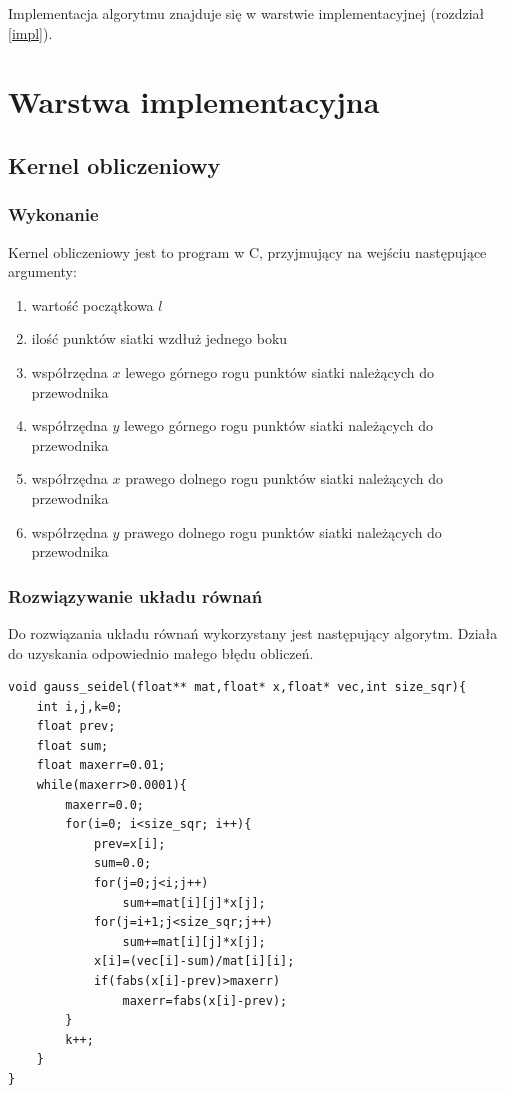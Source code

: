 \documentclass{article}
\begin{document}
Implementacja algorytmu znajduje się w warstwie implementacyjnej (rozdział \ref{impl}).

\section{Warstwa implementacyjna}
\subsection{Kernel obliczeniowy}
\subsubsection{Wykonanie}
Kernel obliczeniowy jest to program w C, przyjmujący na wejściu następujące argumenty:
\begin{enumerate}
   \item wartość początkowa $l$
   \item ilość punktów siatki wzdłuż jednego boku
   \item współrzędna $x$ lewego górnego rogu punktów siatki należących do przewodnika
   \item współrzędna $y$ lewego górnego rogu punktów siatki należących do przewodnika
   \item współrzędna $x$ prawego dolnego rogu punktów siatki należących do przewodnika
   \item współrzędna $y$ prawego dolnego rogu punktów siatki należących do przewodnika
\end{enumerate}

\subsubsection{Rozwiązywanie układu równań}
Do rozwiązania układu równań wykorzystany jest następujący algorytm. Działa do uzyskania
odpowiednio małego błędu obliczeń.
\label{impl}
\begin{lstlisting}
void gauss_seidel(float** mat,float* x,float* vec,int size_sqr){
	int i,j,k=0;
	float prev;
	float sum;
	float maxerr=0.01;
	while(maxerr>0.0001){
		maxerr=0.0;
		for(i=0; i<size_sqr; i++){
			prev=x[i];
			sum=0.0;
			for(j=0;j<i;j++)
				sum+=mat[i][j]*x[j];
			for(j=i+1;j<size_sqr;j++)
				sum+=mat[i][j]*x[j];
			x[i]=(vec[i]-sum)/mat[i][i];
			if(fabs(x[i]-prev)>maxerr)
				maxerr=fabs(x[i]-prev);
		}
		k++;
	}
}
\end{lstlisting} 
\end{document}
